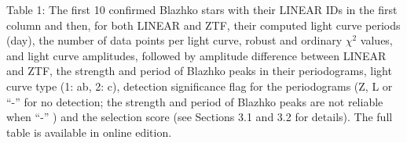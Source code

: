 \documentclass[twocolumn, linenumbers, tighten]{aastex631}
\begin{document}
\appendix

Table 1: The first 10 confirmed Blazhko stars with their LINEAR
IDs in the first column and then, for both LINEAR and ZTF, their
computed  light curve periods (day),
the number of data points per light curve, robust and ordinary $\chi^2$ values, and light curve amplitudes, followed by amplitude 
difference between LINEAR and ZTF, the strength and period of Blazhko peaks in their periodograms, light curve type (1: ab, 2: c), detection
significance flag for the periodograms (Z, L or ``-'' for no detection; the strength and period of Blazhko
peaks are not reliable when ``-'' ) and the selection score (see Sections 3.1 and 3.2 for details). The full table is available in online edition.


%



\end{document}
